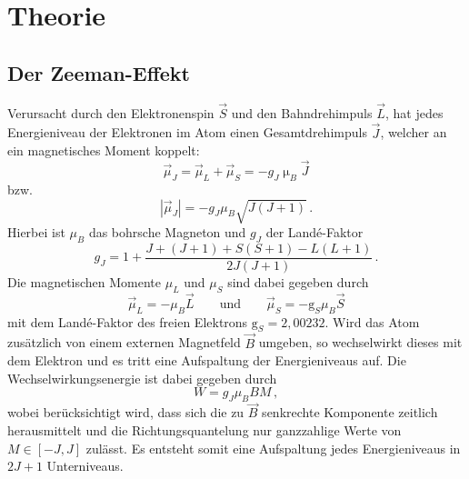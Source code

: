 \section{Theorie}
\subsection{Der Zeeman-Effekt}
Verursacht durch den Elektronenspin $\vec{S}$ und den Bahndrehimpuls $\vec{L}$, hat jedes Energieniveau der Elektronen im Atom einen Gesamtdrehimpuls $\vec{J}$, welcher an ein magnetisches Moment koppelt:
\begin{equation}
  \vec{\mu}_J=\vec{\mu}_L+\vec{\mu}_S=-g_J\upmu_B\vec{J}
\end{equation}
bzw.
\begin{equation}
  |\vec{\mu}_J|=-g_J\mu_B\sqrt{J(J+1)}\,.
\end{equation}
Hierbei ist $\mu_B$ das bohrsche Magneton und $g_J$ der Landé-Faktor
\begin{equation}
  g_J=1+\frac{J+(J+1)+S(S+1)-L(L+1)}{2J(J+1)}\,.
  \label{eq:gj}
\end{equation}
Die magnetischen Momente $\mu_L$ und $\mu_S$ sind dabei gegeben durch
\begin{equation}
\vec{\mu}_L=-\mu_B\vec{L} \quad\quad\text{und}\quad\quad \vec{\mu}_S=-\text{g}_S\mu_B\vec{S}
\end{equation}
mit dem Landé-Faktor des freien Elektrons $\text{g}_S=2{,}00232$.
Wird das Atom zusätzlich von einem externen Magnetfeld $\vec{B}$ umgeben, so wechselwirkt dieses mit dem Elektron und es tritt eine Aufspaltung der Energieniveaus auf. Die Wechselwirkungsenergie ist dabei gegeben durch
\begin{equation}
  W=g_J\mu_BBM\,,
\end{equation}
wobei berücksichtigt wird, dass sich die zu $\vec{B}$ senkrechte Komponente zeitlich herausmittelt und die  Richtungsquantelung nur ganzzahlige Werte von $M \in [-J,J]$ zulässt. Es entsteht somit eine Aufspaltung jedes Energieniveaus in $2J+1$ Unterniveaus.

